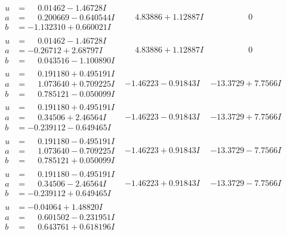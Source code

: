 \documentclass[1p]{elsarticle_modified}
\theoremstyle{definition}
\begin{document}
$$\begin{array}{c|c|c}
\begin{aligned}
u &= \phantom{-}0.01462 - 1.46728 I \\
a &= \phantom{-}0.200669 - 0.640544 I \\
b &= -1.132310 + 0.660021 I\end{aligned}
 & \phantom{-}4.83886 + 1.12887 I & \phantom{-0.000000 } 0 \\ \hline\begin{aligned}
u &= \phantom{-}0.01462 - 1.46728 I \\
a &= -0.26712 + 2.68797 I \\
b &= \phantom{-}0.043516 - 1.100890 I\end{aligned}
 & \phantom{-}4.83886 + 1.12887 I & \phantom{-0.000000 } 0 \\ \hline\begin{aligned}
u &= \phantom{-}0.191180 + 0.495191 I \\
a &= \phantom{-}1.073640 + 0.709225 I \\
b &= \phantom{-}0.785121 - 0.050099 I\end{aligned}
 & -1.46223 - 0.91843 I & -13.3729 + 7.7566 I \\ \hline\begin{aligned}
u &= \phantom{-}0.191180 + 0.495191 I \\
a &= \phantom{-}0.34506 + 2.46564 I \\
b &= -0.239112 - 0.649465 I\end{aligned}
 & -1.46223 - 0.91843 I & -13.3729 + 7.7566 I \\ \hline\begin{aligned}
u &= \phantom{-}0.191180 - 0.495191 I \\
a &= \phantom{-}1.073640 - 0.709225 I \\
b &= \phantom{-}0.785121 + 0.050099 I\end{aligned}
 & -1.46223 + 0.91843 I & -13.3729 - 7.7566 I \\ \hline\begin{aligned}
u &= \phantom{-}0.191180 - 0.495191 I \\
a &= \phantom{-}0.34506 - 2.46564 I \\
b &= -0.239112 + 0.649465 I\end{aligned}
 & -1.46223 + 0.91843 I & -13.3729 - 7.7566 I \\ \hline\begin{aligned}
u &= -0.04064 + 1.48820 I \\
a &= \phantom{-}0.601502 - 0.231951 I \\
b &= \phantom{-}0.643761 + 0.618196 I\end{aligned}

\end{array}$$
\end{document}
